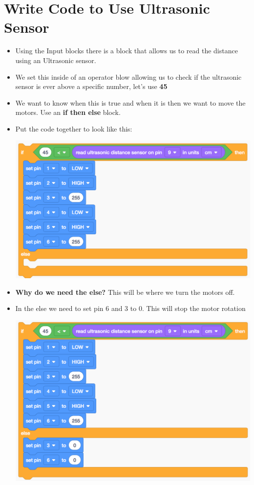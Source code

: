 \documentclass[12pt]{article}
\begin{document}
	
	
	
	
	
\section *{Write Code to Use Ultrasonic Sensor}
	\begin{itemize}
		\item Using the Input blocks there is a block that allows us to read the distance using an Ultrasonic sensor.
		\item We set this inside of an operator blow allowing us to check if the ultrasonic sensor is ever above a specific number, let's use \textbf{45}
		\item We want to know when this is true and when it is then we want to move the motors.  Use an \textbf{if then else} block. 
		\item Put the code together to look like this:
		\begin{center}
			\includegraphics[scale = 0.7]{./Images/code3}
		\end{center}
		\item \textbf{Why do we need the else?} This will be where we turn the motors off.
		\item In the else we need to set pin 6 and 3 to 0.  This will stop the motor rotation
		\begin{center}
			\includegraphics[scale = 0.6]{./Images/code4}

\end{center}
\end{itemize}
\end{document}
